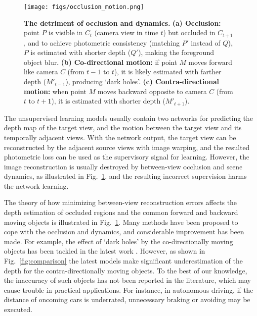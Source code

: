 \documentclass[letterpaper, 10 pt, conference]{ieeeconf}
\begin{document}
\begin{figure}[t]
\vspace{5pt}
\begin{center}
\texttt{[image: figs/occlusion\_motion.png]}
\end{center}
\vspace{-5pt}
\caption{\textbf{The detriment of occlusion and dynamics.} \textbf{(a) Occlusion:} point $P$ is visible in $C_t$ (camera view in time $t$) but occluded in $C_{t+1}$, and to achieve photometric consistency (matching $P'$ instead of $Q$), $P$ is estimated with shorter depth ($Q'$), making the foreground object blur. \textbf{(b) Co-directional motion:} if point $M$ moves forward like camera $C$ (from $t-1$ to $t$), it is likely estimated with farther depth ($M'_{t-1}$), producing `dark holes'. \textbf{ (c) Contra-directional motion:} when point $M$ moves backward opposite to camera $C$ (from $t$ to $t+1$), it is estimated with shorter depth ($M'_{t+1}$).}
\label{fig:om}
\vspace{-10pt}
\end{figure}



The unsupervised learning models usually contain two networks for predicting the depth map of the target view, and the motion between the target view and its temporally adjacent views. 
With the network output, the target view can be reconstructed by the adjacent source views with image warping, and the resulted photometric loss can be used as the supervisory signal for learning. 
However, the image reconstruction is usually destroyed by between-view occlusion and scene dynamics, as illustrated in Fig.~\ref{fig:om}, and the resulting incorrect supervision harms the network learning. 




The theory of how minimizing between-view reconstruction errors affects the depth estimation of occluded regions and the common forward and backward moving objects is illustrated in Fig.~\ref{fig:om}. 
Many methods have been proposed to cope with the occlusion and dynamics, and considerable improvement has been made. 
For example, the effect of `dark holes' by the co-directionally moving objects has been tackled in the latest work \cite{luo2019every, casser2019struct2depth, godard2019digging}. However, as shown in Fig.~\ref{fig:comparison} the latest models make significant underestimation of the depth for the contra-directionally moving objects. To the best of our knowledge, the inaccuracy of such objects has not been reported in the literature, which may cause trouble in practical applications. For instance, in autonomous driving, if the distance of oncoming cars is underrated, unnecessary braking or avoiding may be executed. 
\end{document}
